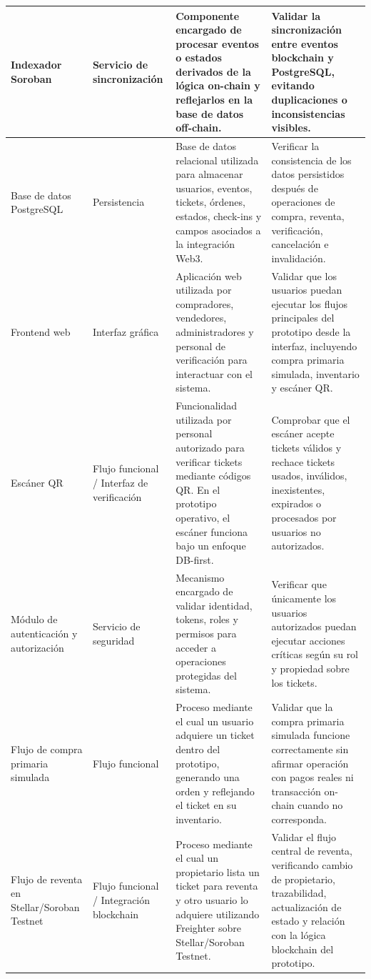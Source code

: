 \documentclass[12pt,letterpaper]{article}
\begin{document}
\begin{longtable}{|
>{\raggedright\arraybackslash}p{2.8cm}|
>{\raggedright\arraybackslash}p{2.5cm}|
>{\raggedright\arraybackslash}p{5.3cm}|
>{\raggedright\arraybackslash}p{4.2cm}|}
Indexador Soroban &
Servicio de sincronización &
Componente encargado de procesar eventos o estados derivados de la lógica on-chain y reflejarlos en la base de datos off-chain. &
Validar la sincronización entre eventos blockchain y PostgreSQL, evitando duplicaciones o inconsistencias visibles. \\
\hline

Base de datos PostgreSQL &
Persistencia &
Base de datos relacional utilizada para almacenar usuarios, eventos, tickets, órdenes, estados, check-ins y campos asociados a la integración Web3. &
Verificar la consistencia de los datos persistidos después de operaciones de compra, reventa, verificación, cancelación e invalidación. \\
\hline

Frontend web &
Interfaz gráfica &
Aplicación web utilizada por compradores, vendedores, administradores y personal de verificación para interactuar con el sistema. &
Validar que los usuarios puedan ejecutar los flujos principales del prototipo desde la interfaz, incluyendo compra primaria simulada, inventario y escáner QR. \\
\hline

Escáner QR &
Flujo funcional / Interfaz de verificación &
Funcionalidad utilizada por personal autorizado para verificar tickets mediante códigos QR. En el prototipo operativo, el escáner funciona bajo un enfoque DB-first. &
Comprobar que el escáner acepte tickets válidos y rechace tickets usados, inválidos, inexistentes, expirados o procesados por usuarios no autorizados. \\
\hline

Módulo de autenticación y autorización &
Servicio de seguridad &
Mecanismo encargado de validar identidad, tokens, roles y permisos para acceder a operaciones protegidas del sistema. &
Verificar que únicamente los usuarios autorizados puedan ejecutar acciones críticas según su rol y propiedad sobre los tickets. \\
\hline

Flujo de compra primaria simulada &
Flujo funcional &
Proceso mediante el cual un usuario adquiere un ticket dentro del prototipo, generando una orden y reflejando el ticket en su inventario. &
Validar que la compra primaria simulada funcione correctamente sin afirmar operación con pagos reales ni transacción on-chain cuando no corresponda. \\
\hline

Flujo de reventa en Stellar/Soroban Testnet &
Flujo funcional / Integración blockchain &
Proceso mediante el cual un propietario lista un ticket para reventa y otro usuario lo adquiere utilizando Freighter sobre Stellar/Soroban Testnet. &
Validar el flujo central de reventa, verificando cambio de propietario, trazabilidad, actualización de estado y relación con la lógica blockchain del prototipo. \\
\hline


\end{longtable}
\end{document}
